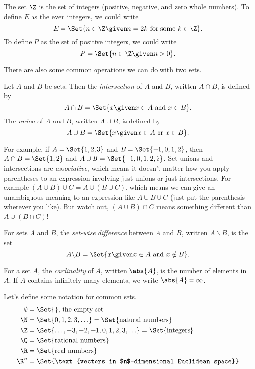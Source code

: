 	\begin{example}
		The set $\Z$ is the set of integers (positive, negative,
		and zero whole numbers).  To define $E$ as the even integers,
		we could write
		\[
			E=\Set{n\in \Z\given n=2k\text{ for some }k\in \Z}.
		\]
		To define $P$ as the set of positive integers, we could write
		\[
			P=\Set{n\in\Z\given n>0}.
		\]
	\end{example}


	There are also some common operations we can do with two sets.
	\begin{definition}
		Let $A$ and $B$ be sets. Then the \emph{intersection} of $A$ and $B$, written
		$A\cap B$, is defined by
		\[
			A\cap B=\Set{x\given x\in A\text{ and }x\in B}.
		\]
		The \emph{union} of $A$ and $B$, written $A\cup B$, is defined by
		\[
			A\cup B= \Set{x\given x\in A\text{ or } x\in B}.
		\]
	\end{definition}
	For example, if $A=\Set{1,2,3}$ and $B=\Set{-1,0,1,2}$, then $A\cap B=\Set{1,2}$ and $A\cup B=
	\Set{-1,0,1,2,3}$.  Set unions and intersections are \emph{associative}, which means it doesn't
	matter how you apply parentheses to an expression involving just unions or just intersections.
	For example $(A\cup B)\cup C=A\cup(B\cup C)$, which means
	we can give an unambiguous meaning to an expression like $A\cup B\cup C$ (just put
	the parenthesis wherever you like).  But watch out, $(A\cup B)\cap C$ means something
	different than $A\cup(B\cap C)$!

	\begin{definition}
		For sets $A$ and $B$, the \emph{set-wise difference} between $A$ and $B$,
		written $A\backslash B$, is the set
		\[
			A\backslash B = \Set{x\given x\in A\text{ and }x\notin B}.
		\]
	\end{definition}
	\begin{definition}[Cardinality]
		For a set $A$, the \emph{cardinality} of $A$,
		written $\abs{A}$, is the number of elements in $A$.  If $A$
		contains infinitely many elements, we write $\abs{A}=\infty$.
	\end{definition}

	Let's define some notation for common sets.
	\begin{align*}
		\emptyset &= \Set{}\text{, the empty set}\\
		\N &= \Set{0,1,2,3,\ldots}=\Set{\text{natural numbers}}\\
		\Z &= \Set{\ldots, -3,-2,-1,0,1,2,3,\ldots}=\Set{\text{integers}}\\
		\Q &= \Set{\text{rational numbers}}\\
		\R &= \Set{\text{real numbers}}\\
		\R^n &= \Set{\text{vectors in $n$-dimensional Euclidean space}}\\
	\end{align*}

